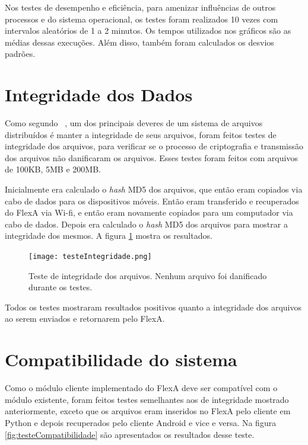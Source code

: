      Nos testes de desempenho e eficiência, para amenizar influências de outros processos e do sistema operacional, os testes foram realizados 10 vezes com intervalos aleatórios de 1 a 2 minutos. Os tempos utilizados nos gráficos são as médias dessas execuções. Além disso, também foram calculados os desvios padrões.

\section{Integridade dos Dados}

Como segundo ~\cite{coulouris}, um dos principais deveres de um sistema de arquivos distribuídos é manter a integridade de seus arquivos, foram feitos testes de integridade dos arquivos, para verificar se o processo de criptografia e transmissão dos arquivos não danificaram os arquivos. Esses testes foram feitos com arquivos de 100KB, 5MB e 200MB.
    
    Inicialmente era calculado o \textit{hash} MD5 dos arquivos, que então eram copiados via cabo de dados para os dispositivos móveis. Então eram transferido e recuperados do FlexA via Wi-fi, e então eram novamente copiados para um computador via cabo de dados. Depois era calculado o \textit{hash} MD5 dos arquivos para mostrar a integridade dos mesmos. A figura \ref{fig:testesIntegridade} mostra os resultados.

    \begin{figure}[!ht]
    \centering
    \texttt{[image: testeIntegridade.png]}
    \caption{Teste de integridade dos arquivos. Nenhum arquivo foi danificado durante os testes.}
    \label{fig:testesIntegridade}
    \end{figure}

    Todos os testes mostraram resultados positivos quanto a integridade dos arquivos ao serem enviados e retornarem pelo FlexA.
    
\section{Compatibilidade do sistema}

    Como o módulo cliente implementado do FlexA deve ser compatível com o módulo existente, foram feitos testes semelhantes aos de integridade mostrado anteriormente, exceto que os arquivos eram inseridos no FlexA pelo cliente em Python e depois recuperados pelo cliente Android e vice e versa. Na figura \ref{fig:testeCompatibilidade} são apresentados os resultados desse teste.
    
